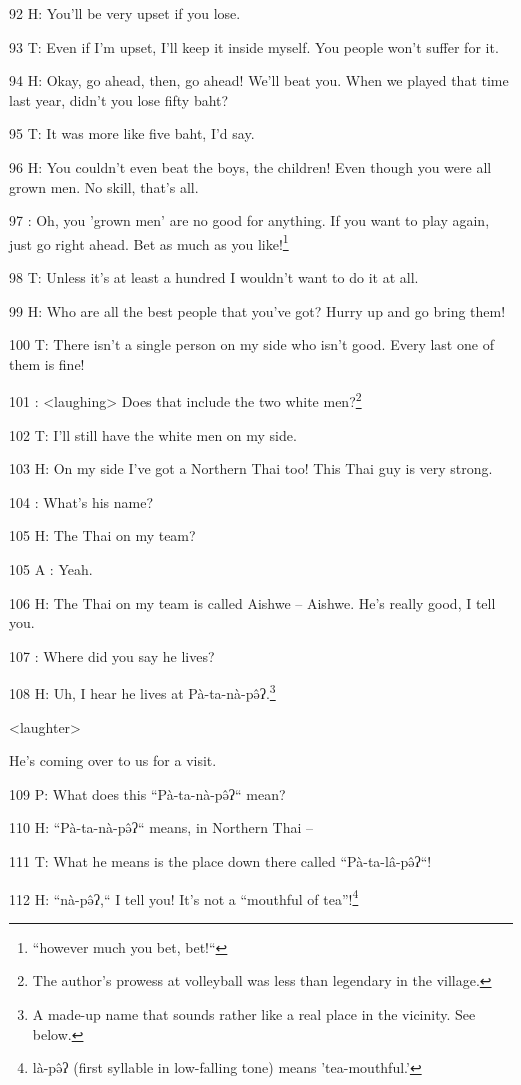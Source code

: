92 H: You'll be very upset if you lose.

93 T: Even if I'm upset, I'll keep it inside myself. You people won't suffer for
it.

94 H: Okay, go ahead, then, go ahead! We'll beat you. When we played that time
last year, didn't you lose fifty baht?

95 T: It was more like five baht, I'd say.

96 H: You couldn't even beat the boys, the children! Even though you were all grown
men. No skill, that's all.

97 : Oh, you 'grown men' are no good for anything. If you want to play again, just
go right ahead. Bet as much as you like!\footnote{``however much you bet, bet!``}

98 T: Unless it's at least a hundred I wouldn't want to do it at all.

99 H: Who are all the best people that you've got? Hurry up and go bring them!

100 T: There isn't a single person on my side who isn't good. Every last one of
them is fine!

101 : <laughing> Does that include the two white men?\footnote{The author's prowess at volleyball was less than legendary in the village.}

102 T: I'll still have the white men on my side.

103 H: On my side I've got a Northern Thai too! This Thai guy is very strong.

104    : What's his name?

105 H: The Thai on my team?

105 A : Yeah.

106 H: The Thai on my team is called Aishwe -- Aishwe. He's really good, I tell
you.

107    : Where did you say he lives?

108 H: Uh, I hear he lives at Pà-ta-nà-pə̂ʔ.\footnote{A made-up name that sounds rather like a real place in the vicinity. See below.}

<laughter>

He's coming over to us for a visit.

109 P: What does this ``Pà-ta-nà-pə̂ʔ`` mean?

110 H: ``Pà-ta-nà-pə̂ʔ`` means, in Northern Thai --

111 T: What he means is the place down there called ``Pà-ta-lâ-pə̂ʔ``!

112 H: ``nà-pə̂ʔ,`` I tell you! It's not a ``mouthful
of tea''!\footnote{là-pə̂ʔ (first syllable in low-falling tone) means 'tea-mouthful.'}

